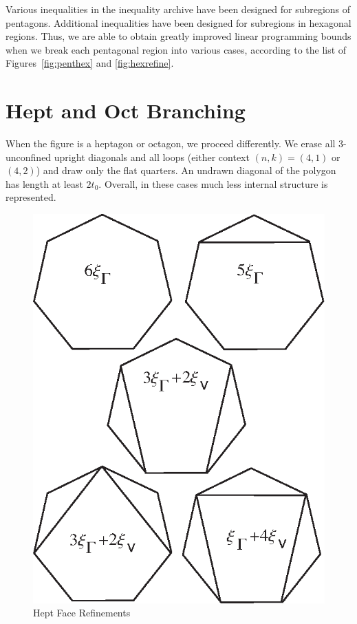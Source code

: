 Various inequalities in the inequality archive have been designed
for subregions of pentagons. Additional inequalities have been
designed for subregions in hexagonal regions.  Thus, we are able
to obtain greatly improved linear programming bounds when we break
each pentagonal region into various cases, according to the list
of Figures~\ref{fig:penthex} and \ref{fig:hexrefine}.

\section{Hept and Oct Branching}

When the figure is a heptagon or octagon, we proceed differently.
We erase all $3$-unconfined upright diagonals and all loops
(either context $(n,k)=(4,1)$ or $(4,2)$) and draw only  the flat
quarters.  An undrawn diagonal of the polygon has length at least
$2t_0$.  Overall, in these cases much less internal structure is
represented.

\begin{figure}[htb]
  \centering
  \includegraphics{PS/heptrefine.eps}
  \caption{Hept Face Refinements}
  \label{fig:heprefine}
\end{figure}

